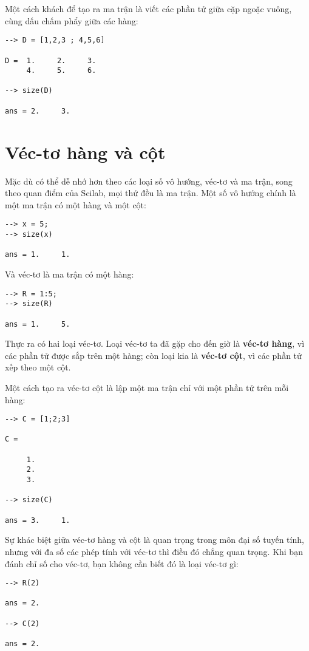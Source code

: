 \documentclass[12pt]{book}
\begin{document}
Một cách khách để tạo ra ma trận là viết các phần tử giữa cặp
ngoặc vuông, cùng dấu chấm phẩy giữa các hàng:

\begin{verbatim}
--> D = [1,2,3 ; 4,5,6]

D =  1.     2.     3.
     4.     5.     6.

--> size(D)

ans = 2.     3.
\end{verbatim}
%

\section{Véc-tơ hàng và cột}

Mặc dù có thể dễ nhớ hơn theo các loại số vô hướng, véc-tơ và ma trận,
song theo quan điểm của Scilab, mọi thứ đều là ma trận. Một số 
vô hướng chính là một ma trận có một hàng và một cột:

\begin{verbatim}
--> x = 5;
--> size(x)

ans = 1.     1.
\end{verbatim}
%
Và véc-tơ là ma trận có một hàng:

\begin{verbatim}
--> R = 1:5;
--> size(R)

ans = 1.     5.
\end{verbatim}
%
Thực ra có hai loại véc-tơ. Loại véc-tơ ta đã gặp cho đến giờ là 
{\bf véc-tơ hàng}, vì các phần tử được sắp trên một hàng; còn
loại kia là {\bf véc-tơ cột}, vì các phần tử xếp theo một cột.

Một cách tạo ra véc-tơ cột là lập một ma trận chỉ với một phần tử
trên mỗi hàng:

\begin{verbatim}
--> C = [1;2;3]

C =

     1.
     2.
     3.

--> size(C)

ans = 3.     1.
\end{verbatim}
%
Sự khác biệt giữa véc-tơ hàng và cột là quan trọng trong môn
đại số tuyến tính, nhưng với đa số các phép tính với véc-tơ thì
điều đó chẳng quan trọng. Khi bạn đánh chỉ số cho véc-tơ, bạn
không cần biết đó là loại véc-tơ gì:

\begin{verbatim}
--> R(2)

ans = 2.

--> C(2)

ans = 2.
\end{verbatim}
\end{document}
